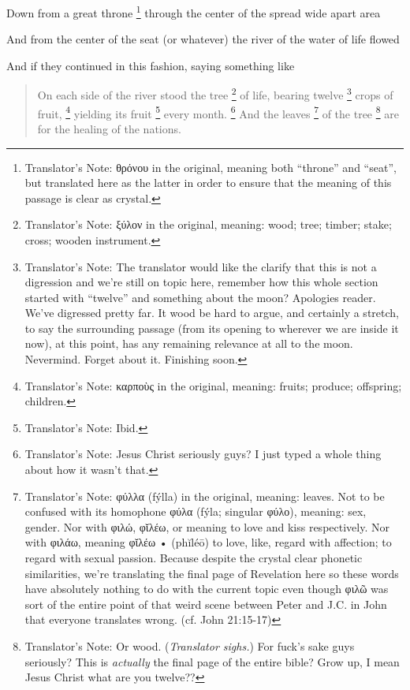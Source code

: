 {{		Down from a great throne%
		\footnote{
			Translator's Note: θρόνου in the original, meaning both ``throne'' and ``seat'',
			but translated here as the latter in order to ensure that the meaning of this passage
			is clear as crystal.
		}
		through the center of the spread wide apart area

		And from the center of the seat (or whatever) the river of the water of life flowed

		And if they continued in this fashion, saying something like

		\begin{quote}
		On each side of the river stood the tree%
		\footnote{
			Translator's Note: ξύλον in the original, meaning: wood; tree; timber; stake; cross; wooden instrument.
		}
		of life, bearing twelve%
		\footnote{
			Translator's Note: The translator would like the clarify that this is not a digression
			and we're still on topic here, remember how this whole section started with ``twelve''
			and something about the moon? Apologies reader. We've digressed pretty far.
			It wood be hard to argue, and certainly a stretch, to say the surrounding passage
			(from its opening to wherever we are inside it now), at this point, has any remaining
			relevance at all to the moon. Nevermind. Forget about it. Finishing soon.
		}
		crops of fruit,%
		\footnote{
			Translator's Note: καρποὺς in the original, meaning: fruits; produce; offspring; children.
		}
		yielding its fruit%
		\footnote{
			Translator's Note: Ibid.
		}
		every month.%
		\footnote{
			Translator's Note: Jesus Christ seriously guys? I just typed a whole thing about how it wasn't that.
		}
		And the leaves%
		\footnote{
			Translator's Note: φύλλα (fýlla) in the original, meaning: leaves.
			Not to be confused with its homophone φύλα (fýla; singular φύλο), meaning: sex, gender.
			Nor with φιλώ, φῐλέω, or meaning to love and kiss respectively.
			Nor with φιλάω, meaning φῐλέω • (phĭléō) to love, like, regard with affection; to regard with sexual passion.
			Because despite the crystal clear phonetic similarities, we're translating the final page of Revelation here
			so these words have absolutely nothing to do with the current topic even though φιλῶ was sort of the entire
			point of that weird scene between Peter and J.C. in John that everyone translates wrong.
			(cf. John 21:15-17)
		}
		of the tree%
		\footnote{
			Translator's Note: Or wood. (\textsl{Translator sighs.}) For fuck's sake guys seriously?
			This is \textit{actually} the final page of the entire bible?
			Grow up, I mean Jesus Christ what are you twelve??
		}
		are for the healing of the nations.
		\end{quote}

}}

